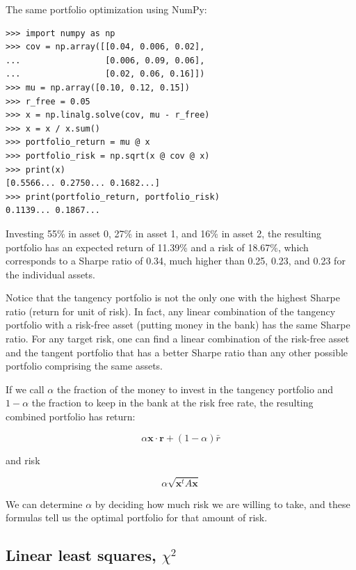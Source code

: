 \documentclass[justified, sixbynine]{tufte-book}
\theoremstyle{plain}%
\newtheorem * {corollary}{Corollary}
\theoremstyle{definition}
\theoremstyle{remark}
\newtheorem * {remark}{Remark}
\newtheorem * {note}{Note}
\begin{document}
\begin{fullwidth}
The same portfolio optimization using NumPy:

\begin{lstlisting}
>>> import numpy as np
>>> cov = np.array([[0.04, 0.006, 0.02],
...                 [0.006, 0.09, 0.06],
...                 [0.02, 0.06, 0.16]])
>>> mu = np.array([0.10, 0.12, 0.15])
>>> r_free = 0.05
>>> x = np.linalg.solve(cov, mu - r_free)
>>> x = x / x.sum()
>>> portfolio_return = mu @ x
>>> portfolio_risk = np.sqrt(x @ cov @ x)
>>> print(x)
[0.5566... 0.2750... 0.1682...]
>>> print(portfolio_return, portfolio_risk)
0.1139... 0.1867...
\end{lstlisting}

Investing 55\% in asset 0, 27\% in asset 1, and 16\% in asset 2, the resulting portfolio has an expected return of 11.39\% and a risk of 18.67\%, which corresponds to a Sharpe ratio of 0.34, much higher than 0.25, 0.23, and 0.23 for the individual assets.

Notice that the tangency portfolio is not the only one with the highest Sharpe ratio (return for unit of risk). In fact, any linear combination of the tangency portfolio with a risk-free asset (putting money in the bank) has the same Sharpe ratio. For any target risk, one can find a linear combination of the risk-free asset and the tangent portfolio that has a better Sharpe ratio than any other possible portfolio comprising the same assets.

If we call $\alpha$ the fraction of the money to invest in the tangency portfolio and $1-\alpha$ the fraction to keep in the bank at the risk free rate, the resulting combined portfolio has return:

\begin{equation}
\alpha \mathbf{x}\cdot\mathbf{r} + (1-\alpha) \bar r
\end{equation}

and risk

\begin{equation}
\alpha \sqrt{\mathbf{x}^t A \mathbf{x}}
\end{equation}

We can determine $\alpha$ by deciding how much risk we are willing to take, and these formulas tell us the optimal portfolio for that amount of risk.


\goodbreak\subsection{Linear least squares, $\chi^2$}


\end{fullwidth}
\end{document}

